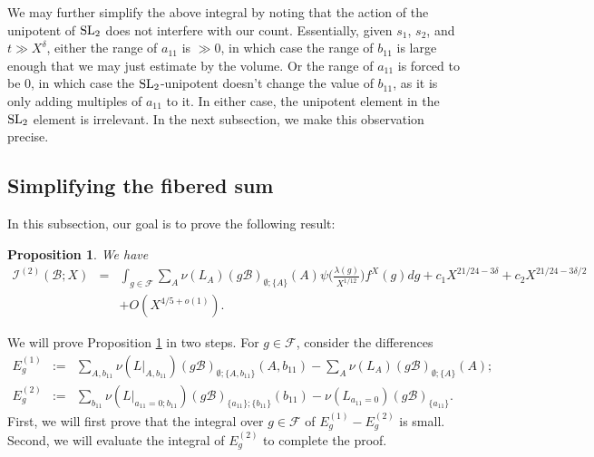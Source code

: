 \documentclass{article}
\def\SL{{\rm SL}}
\def\cB{{\mathcal B}}
\def\FF{{\mathcal F}}
\def\I{{\mathcal I}}
\newtheorem{proposition}[theorem]{Proposition}
\begin{document}
We may further simplify the above integral by noting that the action of the unipotent of $\SL_2$ does not interfere with our count.
Essentially, given $s_1$, $s_2$, and $t\gg X^\delta$, either the range of $a_{11}$ is $\gg 0$, in which case the range of $b_{11}$ is large enough that we may just estimate by the volume. Or the range of $a_{11}$ is forced to be $0$, in which case the $\SL_2$-unipotent doesn't change the value of $b_{11}$, as it is only adding multiples of $a_{11}$ to it. In either case, the unipotent element in the $\SL_2$ element is irrelevant. In the next subsection, we make this observation precise.



\subsection{Simplifying the fibered sum}



In this subsection, our goal is to prove the following result:
\begin{proposition}\label{prop:t_large_Ab11_to_A}
We have
\begin{equation*}
\begin{array}{rcl}
\displaystyle\I^{(2)}(\cB;X)
&=&\displaystyle
\int_{g\in\FF}\sum_{A}\nu(L_{A})(g\cB)_{\emptyset;\{A\}}(A)\psi\Big(\frac{\lambda(g)}{X^{1/12}}\Big)f^X(g)dg
+c_1X^{21/24-3\delta}+c_2X^{21/24-3\delta/2}
\\[.2in]&&\displaystyle
+O(X^{4/5+o(1)}).
\end{array}
\end{equation*}
\end{proposition}

\noindent We will prove Proposition \ref{prop:t_large_Ab11_to_A} in two steps. For $g\in\FF$, consider the differences
\begin{equation*}
\begin{array}{rcl}
E^{(1)}_g&:=&\displaystyle\sum_{A,b_{11}}\nu(L|_{A,b_{11}})(g\cB)_{\emptyset;\{A,b_{11}\}}(A,b_{11})-\sum_{A}\nu(L_{A})(g\cB)_{\emptyset;\{A\}}(A);
\\[.15in]
E^{(2)}_g&:=&\displaystyle\sum_{b_{11}}\nu(L|_{a_{11}=0;b_{11}})(g\cB)_{\{a_{11}\};\{b_{11}\}}(b_{11})-\nu(L_{a_{11}=0})(g\cB)_{\{a_{11}\}}.
\end{array}
\end{equation*}
First, we will first prove that the integral over $g\in\FF$ of
$E_g^{(1)}-E_g^{(2)}$ is small. Second, we will evaluate the integral
of $E_g^{(2)}$ to complete the proof.
\end{document}
